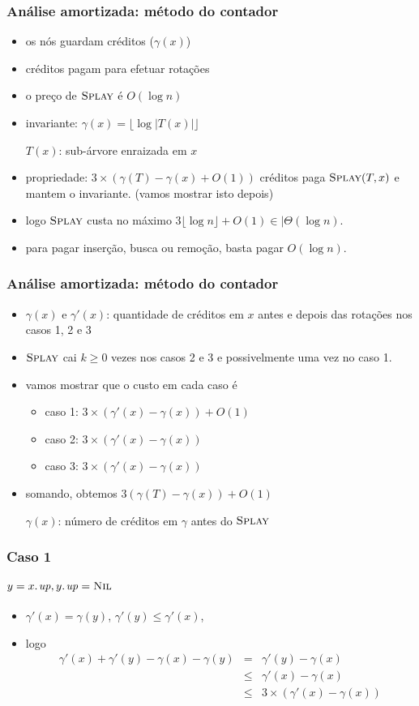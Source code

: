 \documentclass{beamer}
\begin{document}
\begin{frame}
\frametitle{Análise amortizada: método do contador}
\begin{itemize}
\item os nós guardam créditos ($\gamma(x)$)
\item créditos pagam para efetuar rotações
\item o preço de $\textnormal{\scshape Splay}$ é $O(\log n)$
\item invariante: $\gamma(x) = \lfloor \log | T(x) | \rfloor$

  $T(x)$: sub-árvore enraizada em $x$

\item propriedade: $3 \times (\gamma(T) - \gamma(x) + O(1))$ créditos paga $\textnormal{\scshape Splay}(T, x)$ e mantem o invariante. (\alert{vamos mostrar isto depois})
\item logo $\textnormal{\scshape Splay}$ custa no máximo $3 \lfloor \log n \rfloor + O(1) \in |\Theta(\log n)$.
\item para pagar inserção, busca ou remoção, basta pagar $O(\log n)$.
\end{itemize}
\end{frame}

\begin{frame}
\frametitle{Análise amortizada: método do contador}
\begin{itemize}
\item $\gamma(x)$ e $\gamma'(x)$: quantidade de créditos em $x$ antes
e depois das rotações nos casos 1, 2 e 3
\item $\textnormal{\scshape Splay}$ cai $k \ge 0$ vezes nos casos 2 e 3 e
  possivelmente uma vez no caso 1.
\item vamos mostrar que o custo em cada caso é
\begin{itemize}
\item caso 1: $3 \times(\gamma'(x) - \gamma(x)) + O(1)$
\item caso 2: $3 \times(\gamma'(x) - \gamma(x))$
\item caso 3: $3 \times(\gamma'(x) - \gamma(x))$
\end{itemize}
\item somando, obtemos $3(\gamma(T) - \gamma(x)) + O(1)$

$\gamma(x)$: número de créditos em $\gamma$ antes do $\textnormal{\scshape Splay}$
\end{itemize}
\end{frame}

\begin{frame}
\frametitle{Caso 1}
\framesubtitle{$y = \attrib{x}{up}, \attrib{y}{up} = \const{Nil}$}

\begin{itemize}
\item $\gamma'(x) = \gamma(y)$, $\gamma'(y) \le \gamma'(x)$,
\item logo 
\begin{eqnarray*}
\gamma'(x) + \gamma'(y) - \gamma(x) - \gamma(y) & = & \gamma'(y) - \gamma(x) \\
& \le & \gamma'(x) - \gamma(x) \\
& \le & 3 \times(\gamma'(x) - \gamma(x))
\end{eqnarray*}
\end{itemize}
\end{frame}
\end{document}
